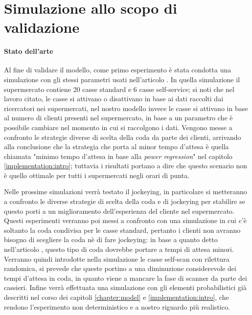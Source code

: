\section{Simulazione allo scopo di validazione}

\paragraph{Stato dell'arte}

Al fine di validare il modello, come primo esperimento è stata condotta una simulazione con gli stessi parametri usati nell'articolo \cite{article1}. In quella simulazione il supermercato contiene 20 casse standard e 6 casse self-service; si noti che nel lavoro citato, le casse si attivano o disattivano in base ai dati raccolti dai ricercatori nei supermercati, nel nostro modello invece le casse si attivano in base al numero di clienti presenti nel supermercato, in base a un parametro che è possibile cambiare nel momento in cui si raccolgono i dati. Vengono messe a confronto le strategie diverse di scelta della coda da parte dei clienti, arrivando alla conclusione che la strategia che porta al minor tempo d'attesa è quella chiamata "minimo tempo d'attesa in base alla \textit{power regression}" nel capitolo \ref{implementation:intro}; tuttavia i risultati portano a dire che questo scenario non è quello ottimale per tutti i supermercati negli orari di punta.

Nelle prossime simulazioni verrà testato il jockeying, in particolare si metteranno a confronto le diverse strategie di scelta della coda e di jockeying per stabilire se questo porti a un miglioramento dell'esperienza del cliente nel supermercato. Questi esperimenti verranno poi messi a confronto con una simulazione in cui c'è soltanto la coda condivisa per le casse standard, pertanto i clienti non avranno bisogno di scegliere la coda nè di fare jockeying: in base a quanto detto nell'articolo \cite{yanagisawa2011methods}, questo tipo di coda dovrebbe portare a tempi di attesa minori. 
Verranno quindi introdotte nella simulazione le casse self-scan con rilettura randomica, si prevede che queste portino a una diminuzione considerevole dei tempi d'attesa in coda, in quanto viene a mancare la fase di scanner da parte dei cassieri. Infine verrà effettuata una simulazione con gli elementi probabilistici già descritti nel corso dei capitoli \ref{chapter:model} e \ref{implementation:intro}, che rendono l'esperimento non deterministico e a nostro riguardo più realistico.

